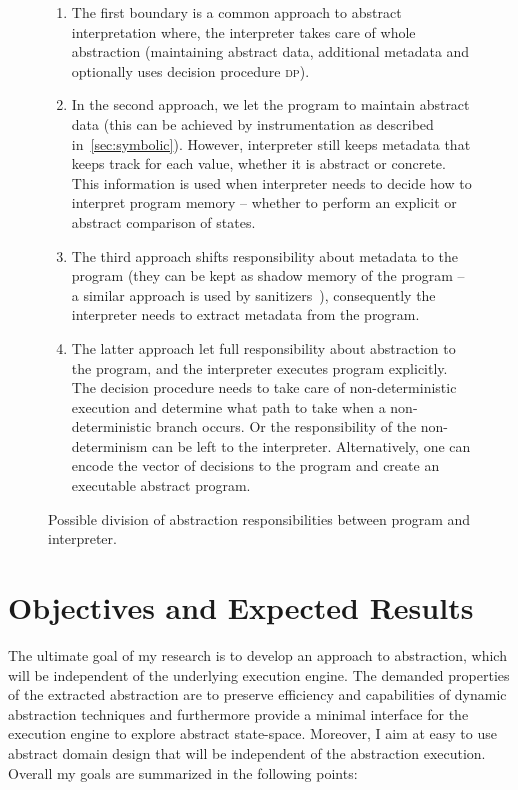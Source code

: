 \begin{figure}[h]
{
}

\bigskip
\prule

\begin{enumerate}
    \item The first boundary is a common approach to abstract
        interpretation where, the interpreter takes care of whole abstraction
        (maintaining abstract data, additional metadata and optionally uses
        decision procedure \textsc{dp}).
    \item In the second approach, we let the program to maintain abstract
        data (this can be achieved by instrumentation as described
        in~\autoref{sec:symbolic}).  However, interpreter still keeps metadata
        that keeps track for each value, whether it is abstract or concrete.
        This information is used when interpreter needs to decide how to
        interpret program memory -- whether to perform an explicit or abstract
        comparison of states.
    \item The third approach shifts responsibility about metadata to
        the program (they can be kept as shadow memory of the program -- a
        similar approach is used by sanitizers~\cite{Stepanov2015}), consequently the
        interpreter needs to extract metadata from the program.
    \item The latter approach let full responsibility about abstraction to the
        program, and the interpreter executes program explicitly. The decision
        procedure needs to take care of non-deterministic execution and
        determine what path to take when a non-deterministic branch occurs. Or
        the responsibility of the non-determinism can be left to the
        interpreter. Alternatively, one can encode the vector of decisions to
        the program and create an executable abstract program.
\end{enumerate}

\caption{Possible division of abstraction responsibilities between program and interpreter.}
\label{fig:bounds}

\end{figure}

\section{Objectives and Expected Results}
\label{sec:objectives}

The ultimate goal of my research is to develop an approach to abstraction,
which will be independent of the underlying execution engine. The demanded
properties of the extracted abstraction are to preserve efficiency and
capabilities of dynamic abstraction techniques and furthermore provide a
minimal interface for the execution engine to explore abstract state-space.
Moreover, I aim at easy to use abstract domain design that will be independent
of the abstraction execution. Overall my goals are summarized in the following
points:

